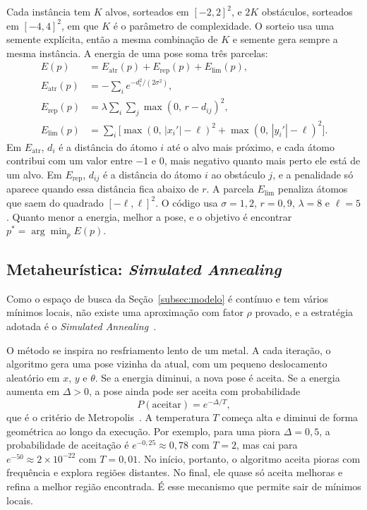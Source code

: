 \documentclass[conference]{IEEEtran}
\theoremstyle{definition}
\theoremstyle{plain}
\begin{document}
Cada instância tem $K$ alvos, sorteados em $[-2, 2]^2$, e $2K$ obstáculos, sorteados em $[-4, 4]^2$, em que $K$ é o parâmetro de complexidade. O sorteio usa uma semente explícita, então a mesma combinação de $K$ e semente gera sempre a mesma instância. A energia de uma pose soma três parcelas:
\begin{align}
E(p) &= E_{\text{atr}}(p) + E_{\text{rep}}(p) + E_{\text{lim}}(p), \label{eq:energia}\\
E_{\text{atr}}(p) &= -\textstyle\sum_{i} e^{-d_i^2/(2\sigma^2)}, \nonumber\\
E_{\text{rep}}(p) &= \lambda \textstyle\sum_{i}\sum_{j} \max(0,\, r - d_{ij})^2, \nonumber\\
E_{\text{lim}}(p) &= \textstyle\sum_{i} \big[\max(0,\, |x_i'| - \ell)^2 + \max(0,\, |y_i'| - \ell)^2\big]. \nonumber
\end{align}
Em $E_{\text{atr}}$, $d_i$ é a distância do átomo $i$ até o alvo mais próximo, e cada átomo contribui com um valor entre $-1$ e $0$, mais negativo quanto mais perto ele está de um alvo. Em $E_{\text{rep}}$, $d_{ij}$ é a distância do átomo $i$ ao obstáculo $j$, e a penalidade só aparece quando essa distância fica abaixo de $r$. A parcela $E_{\text{lim}}$ penaliza átomos que saem do quadrado $[-\ell, \ell]^2$. O código usa $\sigma = 1{,}2$, $r = 0{,}9$, $\lambda = 8$ e $\ell = 5$. Quanto menor a energia, melhor a pose, e o objetivo é encontrar $p^* = \arg\min_p E(p)$.

\subsection{Metaheurística: \textit{Simulated Annealing}}
\label{subsec:sa}

Como o espaço de busca da Seção~\ref{subsec:modelo} é contínuo e tem vários mínimos locais, não existe uma aproximação com fator $\rho$ provado, e a estratégia adotada é o \textit{Simulated Annealing}~\cite{kirkpatrick1983optimization}.

O método se inspira no resfriamento lento de um metal. A cada iteração, o algoritmo gera uma pose vizinha da atual, com um pequeno deslocamento aleatório em $x$, $y$ e $\theta$. Se a energia diminui, a nova pose é aceita. Se a energia aumenta em $\Delta > 0$, a pose ainda pode ser aceita com probabilidade
\begin{equation}
P(\text{aceitar}) = e^{-\Delta / T},
\label{eq:metropolis}
\end{equation}
que é o critério de Metropolis~\cite{metropolis1953equation}. A temperatura $T$ começa alta e diminui de forma geométrica ao longo da execução. Por exemplo, para uma piora $\Delta = 0{,}5$, a probabilidade de aceitação é $e^{-0{,}25} \approx 0{,}78$ com $T = 2$, mas cai para $e^{-50} \approx 2 \times 10^{-22}$ com $T = 0{,}01$. No início, portanto, o algoritmo aceita pioras com frequência e explora regiões distantes. No final, ele quase só aceita melhoras e refina a melhor região encontrada. É esse mecanismo que permite sair de mínimos locais.
\end{document}
